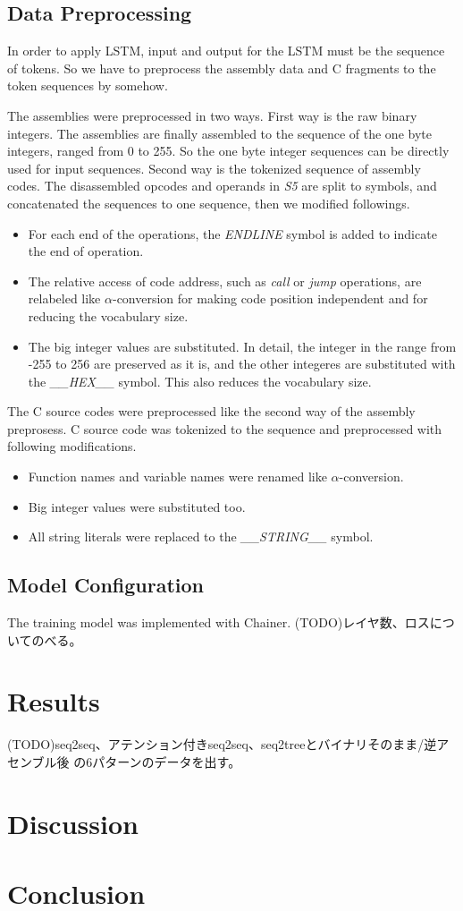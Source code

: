 \documentclass[senior,final,11pt]{iscs-thesis}
\begin{document}
\section{Data Preprocessing}

In order to apply LSTM, input and output for the LSTM must be the sequence of tokens. 
So we have to preprocess the assembly data and C fragments to the token sequences by somehow.

The assemblies were preprocessed in two ways.
First way is the raw binary integers. The assemblies are finally assembled to the sequence of the one byte integers, ranged from 0 to 255.
So the one byte integer sequences can be directly used for input sequences.
Second way is the tokenized sequence of assembly codes. 
The disassembled opcodes and operands in {\sl S5} are split to symbols, and concatenated the sequences to one sequence, then we modified followings.
\begin{itemize}
\item For each end of the operations, the {\sl ENDLINE} symbol is added to indicate the end of operation.
\item 
The relative access of code address, such as {\sl call} or {\sl jump} operations, 
are relabeled like $\alpha$-conversion for making code position independent and for reducing the vocabulary size.
\item The big integer values are substituted. 
In detail, the integer in the range from -255 to 256 are preserved as it is, and the other integeres are substituted with the {\sl \_\_HEX\_\_} symbol.
This also reduces the vocabulary size.
\end{itemize}

The C source codes were preprocessed like the second way of the assembly preprosess.
C source code was tokenized to the sequence and preprocessed with following modifications.
\begin{itemize}
\item Function names and variable names were renamed like $\alpha$-conversion.
\item Big integer values were substituted too. 
\item All string literals were replaced to the {\sl \_\_STRING\_\_} symbol.
\end{itemize}



\section{Model Configuration}
The training model was implemented with Chainer.
(TODO)レイヤ数、ロスについてのべる。

\chapter{Results}
(TODO)seq2seq、アテンション付きseq2seq、seq2treeとバイナリそのまま/逆アセンブル後 の6パターンのデータを出す。
\chapter{Discussion}
\chapter{Conclusion}



\end{document}
